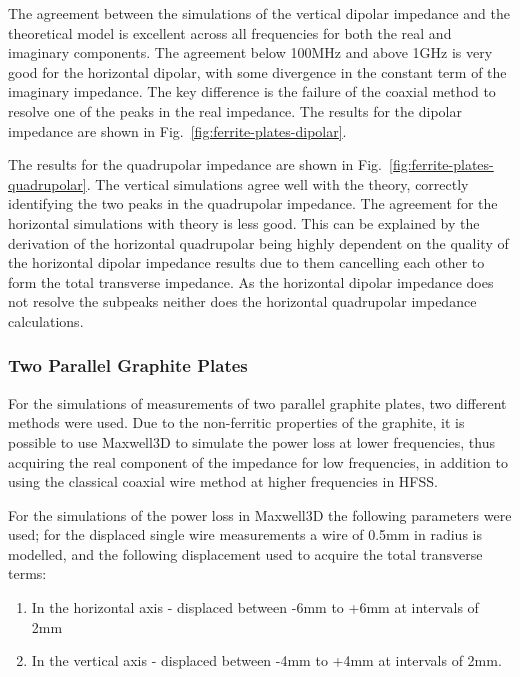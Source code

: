 The agreement between the simulations of the vertical dipolar impedance and the theoretical model is excellent across all frequencies for both the real and imaginary components. The agreement below 100MHz and above 1GHz is very good for the horizontal dipolar, with some divergence in the constant term of the imaginary impedance. The key difference is the failure of the coaxial method to resolve one of the peaks in the real impedance. The results for the dipolar impedance are shown in Fig.~\ref{fig:ferrite-plates-dipolar}.

The results for the quadrupolar impedance are shown in Fig.~\ref{fig:ferrite-plates-quadrupolar}. The vertical simulations agree well with the theory, correctly identifying the two peaks in the quadrupolar impedance. The agreement for the horizontal simulations with theory is less good. This can be explained by the derivation of the horizontal quadrupolar being highly dependent on the quality of the horizontal dipolar impedance results due to them cancelling each other to form the total transverse impedance. As the horizontal dipolar impedance does not resolve the subpeaks neither does the horizontal quadrupolar impedance calculations.

\subsubsection{Two Parallel Graphite Plates}

For the simulations of measurements of two parallel graphite plates, two different methods were used. Due to the non-ferritic properties of the graphite, it is possible to use Maxwell3D to simulate the power loss at lower frequencies, thus acquiring the real component of the impedance for low frequencies, in addition to using the classical coaxial wire method at higher frequencies in HFSS.

For the simulations of the power loss in Maxwell3D the following parameters were used; for the displaced single wire measurements a wire of 0.5mm in radius is modelled, and the following displacement used to acquire the total transverse terms:

\begin{enumerate}
\item{In the horizontal axis -  displaced between -6mm to +6mm at intervals of 2mm}
\item{In the vertical axis - displaced between -4mm to +4mm at intervals of 2mm.}
\end{enumerate}

